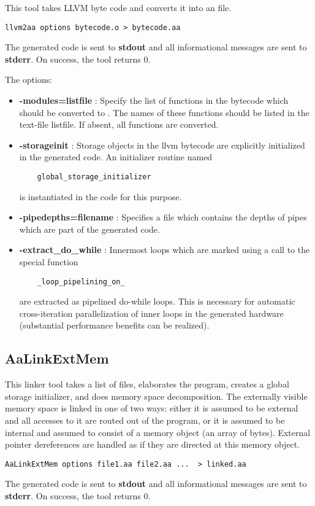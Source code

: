 This tool takes LLVM byte code and converts it into an
\Aa file.
\begin{verbatim}
llvm2aa options bytecode.o > bytecode.aa
\end{verbatim}
The generated \Aa code is sent to {\bf stdout} and all informational
messages are sent to {\bf stderr}.  On success, the tool returns 0.

The options:
\begin{itemize}
\item {\bf -modules=listfile} : Specify the list of functions in the bytecode
which should be converted to \Aa.   The names of these functions should be
listed in the text-file listfile. If absent, all functions
are converted.
\item {\bf -storageinit} :  Storage objects in the llvm bytecode
are explicitly initialized in the generated \Aa code.   An initializer
routine named
\begin{verbatim}
    global_storage_initializer
\end{verbatim}
is instantiated in
the \Aa code for this purpose.
\item {\bf -pipedepths=filename} : Specifies a file which contains
the depths of pipes which are part of the generated \Aa code.
\item {\bf -extract\_do\_while} : Innermost loops which are marked
using a call to the special function 
\begin{verbatim}
    _loop_pipelining_on_
\end{verbatim}
are extracted as pipelined do-while loops.  This is necessary
for automatic cross-iteration parallelization of inner loops in the 
generated hardware (substantial performance benefits can be
realized).
\end{itemize}

\subsection{{\bf AaLinkExtMem}}

This linker tool takes a list of \Aa files, elaborates the program,
creates a global storage initializer, and
does memory space decomposition.  The externally visible memory space is
linked in one of two ways: either it is assumed to be external
and all accesses to it are routed out of the \Aa program,
or it is assumed to be internal and assumed to consist of
a memory object (an array of bytes).  External pointer dereferences
are handled as if they are directed at this memory object.
\begin{verbatim}
AaLinkExtMem options file1.aa file2.aa ...  > linked.aa
\end{verbatim}
The generated \Aa code is sent to {\bf stdout} and all informational
messages are sent to {\bf stderr}.  On success, the tool returns 0.

